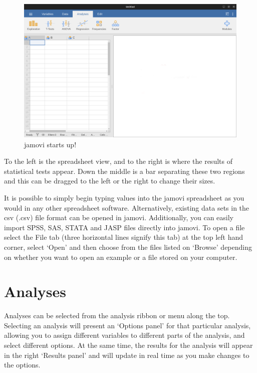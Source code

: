 \documentclass[
  a4paper,
]{book}
\begin{document}
\begin{figure}

\includegraphics[width=1\textwidth,height=\textheight]{images/fig3-1.png} \hfill{}

\caption{\label{fig-fig3-1}jamovi starts up!}

\end{figure}

To the left is the spreadsheet view, and to the right is where the
results of statistical tests appear. Down the middle is a bar separating
these two regions and this can be dragged to the left or the right to
change their sizes.

It is possible to simply begin typing values into the jamovi spreadsheet
as you would in any other spreadsheet software. Alternatively, existing
data sets in the csv (.csv) file format can be opened in jamovi.
Additionally, you can easily import SPSS, SAS, STATA and JASP files
directly into jamovi. To open a file select the File tab (three
horizontal lines signify this tab) at the top left hand corner, select
`Open' and then choose from the files listed on `Browse' depending on
whether you want to open an example or a file stored on your computer.

\hypertarget{analyses}{%
\section{Analyses}\label{analyses}}

Analyses can be selected from the analysis ribbon or menu along the top.
Selecting an analysis will present an `Options panel' for that
particular analysis, allowing you to assign different variables to
different parts of the analysis, and select different options. At the
same time, the results for the analysis will appear in the right
`Results panel' and will update in real time as you make changes to the
options.
\end{document}
